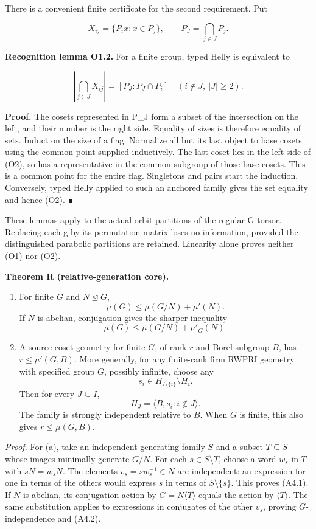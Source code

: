 \documentclass[
  10pt,
  letterpaper,
]{article}
\begin{document}
There is a convenient finite certificate for the second requirement. Put

\[
X_{ij}=\{P_i x:x\in P_j\},\qquad P_J=\bigcap_{j\in J}P_j.
\]

\textbf{Recognition lemma O1.2.} For a finite group, typed Helly is
equivalent to

\[
\left|\bigcap_{j\in J}X_{ij}\right|
 =[P_J:P_J\cap P_i]
\quad(i\notin J,\ |J|\ge2).
\tag{O2}
\]

\textbf{Proof.} The cosets represented in P\_J form a subset of the
intersection on the left, and their number is the right side. Equality
of sizes is therefore equality of sets. Induct on the size of a flag.
Normalize all but its last object to base cosets using the common point
supplied inductively. The last coset lies in the left side of (O2), so
has a representative in the common subgroup of those base cosets. This
is a common point for the entire flag. Singletons and pairs start the
induction. Conversely, typed Helly applied to such an anchored family
gives the set equality and hence (O2). ∎

These lemmas apply to the actual orbit partitions of the regular
G-torsor. Replacing each g by its permutation matrix loses no
information, provided the distinguished parabolic partitions are
retained. Linearity alone proves neither (O1) nor (O2).

\textbf{Theorem R (relative-generation core).}

\begin{enumerate}
\def\labelenumi{(\alph{enumi})}
\item
  For finite \(G\) and \(N\unlhd G\), \[
  \mu(G)\leq\mu(G/N)+\mu'(N).
  \tag{A4.1}
  \] If \(N\) is abelian, conjugation gives the sharper inequality \[
  \mu(G)\leq\mu(G/N)+\mu'_G(N).
  \tag{A4.2}
  \]
\item
  A source coset geometry for finite \(G\), of rank \(r\) and Borel
  subgroup \(B\), has \(r\leq\mu'(G,B)\). More generally, for any
  finite-rank firm RWPRI geometry with specified group \(G\), possibly
  infinite, choose any \[
  s_i\in H_{I\setminus\{i\}}\setminus H_i.
  \tag{A4.3}
  \] Then for every \(J\subseteq I\), \[
  H_J=\langle B,s_i:i\notin J\rangle.
  \tag{A4.4}
  \] The family is strongly independent relative to \(B\). When \(G\) is
  finite, this also gives \(r\leq\mu(G,B)\).
\end{enumerate}

\emph{Proof.} For (a), take an independent generating family \(S\) and a
subset \(T\subseteq S\) whose images minimally generate \(G/N\). For
each \(s\in S\setminus T\), choose a word \(w_s\) in \(T\) with
\(sN=w_sN\). The elements \(v_s=sw_s^{-1}\in N\) are independent: an
expression for one in terms of the others would express \(s\) in terms
of \(S\setminus\{s\}\). This proves (A4.1). If \(N\) is abelian, its
conjugation action by \(G=N\langle T\rangle\) equals the action by
\(\langle T\rangle\). The same substitution applies to expressions in
conjugates of the other \(v_s\), proving \(G\)-independence and (A4.2).
\end{document}
